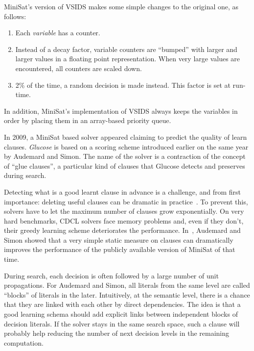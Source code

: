 MiniSat's version of VSIDS makes some simple changes to the original one, as
follows:

\begin{enumerate}
    \item Each \emph{variable} has a counter.
    \item Instead of a decay factor, variable counters are ``bumped'' with
        larger and larger values in a floating point representation. When very
        large values are encountered, all counters are scaled down.
    \item 2\% of the time, a random decision is made instead. This factor is set
        at run-time.
\end{enumerate}
In addition, MiniSat's implementation of VSIDS always keeps the variables in
order by placing them in an array-based priority queue.

In 2009, a MiniSat based solver appeared claiming to predict the quality of
learn clauses. \emph{Glucose} is based on a scoring scheme introduced earlier on
the same year by Audemard and Simon. The name of the solver is a contraction of
the concept of ``glue clauses'', a particular kind of clauses that Glucose
detects and preserves during search.

Detecting what is a good learnt clause in advance is a challenge, and from first
importance: deleting useful clauses can be dramatic in practice~\cite{glucose}.
To prevent this, solvers have to let the maximum number of clauses grow
exponentially. On very hard benchmarks, CDCL solvers face memory problems and,
even if they don't, their greedy learning scheme deteriorates the performance.
In~\cite{audemard2009predicting}, Audemard and Simon showed that a very simple
static measure on clauses can dramatically improves the performance of the
publicly available version of MiniSat of that time.

During search, each decision is often followed by a large number of unit
propagations. For Audemard and Simon, all literals from the same level are
called ``blocks'' of literals in the later. Intuitively, at the semantic level,
there is a chance that they are linked with each other by direct dependencies.
The idea is that a good learning schema should add explicit links between
independent blocks of decision literals. If the solver stays in the same search
space, such a clause will probably help reducing the number of next decision
levels in the remaining computation.


